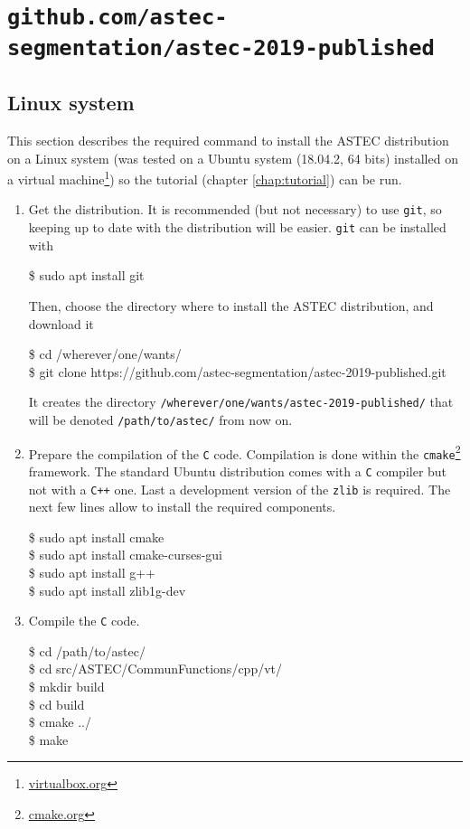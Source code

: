 \section{\texttt{github.com/astec-segmentation/astec-2019-published}}

\subsection{Linux system}

This section describes the required command to install the ASTEC
distribution on a Linux system (was tested on a Ubuntu system
(18.04.2, 64 bits) installed on a virtual
machine\footnote{\url{virtualbox.org}}) so the tutorial (chapter \ref{chap:tutorial}) can be run.

\begin{enumerate}
\item Get the distribution. It is recommended (but not necessary) to
  use \texttt{git}, so keeping up to date with the distribution will
  be easier.   \texttt{git} can be installed with
  \begin{code}{0.8}
  \$ sudo apt install git
  \end{code}
  Then, choose the directory where to install the ASTEC distribution,
  and download it
  \begin{code}{0.8}
    \$ cd /wherever/one/wants/ \\
    \$ git clone https://github.com/astec-segmentation/astec-2019-published.git
  \end{code}
  It creates the directory
  \texttt{/wherever/one/wants/astec-2019-published/} that will be
  denoted \texttt{/path/to/astec/} from now on.


\item Prepare the compilation of the \texttt{C} code. Compilation is done within the
  \texttt{cmake}\footnote{\url{cmake.org}} framework. The standard
  Ubuntu distribution comes with a \texttt{C} compiler but not with a
  \texttt{C++} one. Last a development version of the \texttt{zlib} is
  required. The next few lines allow to install the required components.
  \begin{code}{0.8}
    \$ sudo apt install cmake \\
    \$ sudo apt install cmake-curses-gui \\
    \$ sudo apt install g++ \\
    \$ sudo apt install zlib1g-dev
  \end{code}
\item Compile the \texttt{C} code.
    \begin{code}{0.8}
    \$ cd /path/to/astec/ \\
    \$ cd src/ASTEC/CommunFunctions/cpp/vt/ \\
    \$ mkdir build \\
    \$ cd build \\
    \$ cmake ../ \\
    \$ make \\
  \end{code}


\end{enumerate}

